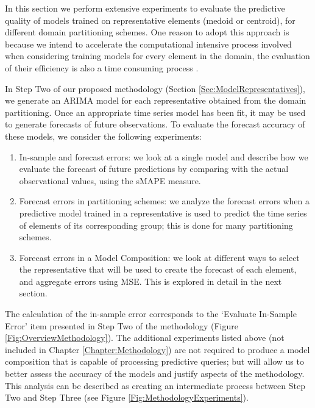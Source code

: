 In this section we perform extensive experiments to evaluate the predictive quality of models trained on representative elements (medoid or centroid), for different domain partitioning schemes. One reason to adopt this approach is because we intend to accelerate the computational intensive process involved when considering training models for every element in the domain, the evaluation of their efficiency is also a time consuming process \cite{Hyndman2018}.

In Step Two of our proposed methodology (Section \ref{Sec:ModelRepresentatives}), we generate an ARIMA model for each representative obtained from the domain partitioning. Once an appropriate time series model has been fit, it may be used to generate forecasts of future observations. To evaluate the forecast accuracy of these models, we consider the following experiments:

\begin{enumerate}
    \item In-sample and forecast errors: we look at a single model and describe how we evaluate the forecast of future predictions by comparing with the actual observational values, using the sMAPE measure.
    \item Forecast errors in partitioning schemes: we analyze the forecast errors when a predictive model trained in a representative is used to predict the time series of elements of its corresponding group; this is done for many partitioning schemes.
    \item Forecast errors in a Model Composition: we look at different ways to select the representative that will be used to create the forecast of each element, and aggregate errors using MSE. This is explored in detail in the next section.
\end{enumerate}

The calculation of the in-sample error corresponds to the `Evaluate In-Sample Error' item presented in Step Two of the methodology (Figure \ref{Fig:OverviewMethodology}). The additional experiments listed above (not included in Chapter \ref{Chapter:Methodology}) are not required to produce a model composition that is capable of processing predictive queries; but will allow us to better assess the accuracy of the models and justify aspects of the methodology. This analysis can be described as creating an intermediate process between Step Two and Step Three (see Figure \ref{Fig:MethodologyExperiments}). 

